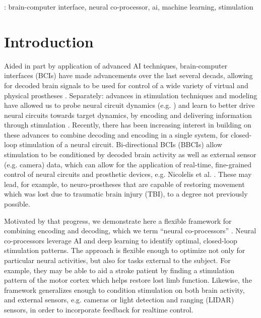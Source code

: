 \documentclass[12pt]{iopart}
\begin{document}
\vspace{2pc}
: brain-computer interface, neural co-processor, ai, machine learning, stimulation
%
%
\maketitle
% 
%



\section{Introduction}
Aided in part by application of advanced AI techniques, brain-computer interfaces (BCIs) have made
advancements over the last several decads, allowing for decoded brain signals to be used for
control of a wide variety of virtual and physical prostheses \cite{rao.bcibook, wolpaw.bcibook,
moritz.neuro, lebedev.bmi}. Separately: advances in stimulation techniques and modeling have allowed
us to probe neural circuit dynamics (e.g. \cite{walker.inception}) and learn to better drive neural
circuits towards target dynamics, by encoding and delivering information through
stimulation \cite{niparko.cochlear, weiland.retinal, tomlinson.propr, tabot.tact, tyler.tact,
dadarlat.tact, sharlene.tact, cronin.tact}.
Recently, there has been increasing interest in building on these advances to combine decoding
and encoding in a single system, for closed-loop stimulation of a neural circuit. Bi-directional
BCIs (BBCIs) allow stimulation to be conditioned by decoded brain activity as well as external
sensor (e.g. camera) data, which can allow for the application of real-time, fine-grained control of
neural circuits and prosthetic devices, e.g. Nicolelis et al. \cite{nicolelis.bmbi}. These may lead,
for example, to neuro-prostheses that are capable of restoring movement which was lost due to
traumatic brain injury (TBI), to a degree not previously possible.

Motivated by that progress, we demonstrate here a flexible framework for combining encoding
and decoding, which we term ``neural co-processors'' \cite{rao.coproc}. Neural co-processors leverage
AI and deep learning to identify optimal, closed-loop stimulation patterns. The approach is flexible
enough to optimize not only for particular neural activities, but also for tasks external to the
subject. For example, they may be able to aid a stroke patient by finding a stimulation pattern of
the motor cortex which helps restore lost limb function. Likewise, the framework generalizes enough
to condition stimulation on both brain activity, and external sensors, e.g. cameras or light detection
and ranging (LIDAR) sensors, in order to incorporate feedback for realtime control.
\end{document}

